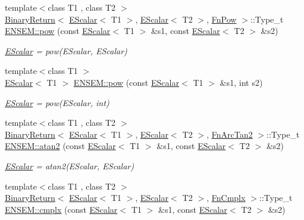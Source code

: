 \begin{DoxyCompactItemize}
\item 
{\footnotesize template$<$class T1 , class T2 $>$ }\\\mbox{\hyperlink{structENSEM_1_1BinaryReturn}{Binary\+Return}}$<$ \mbox{\hyperlink{classENSEM_1_1EScalar}{E\+Scalar}}$<$ T1 $>$, \mbox{\hyperlink{classENSEM_1_1EScalar}{E\+Scalar}}$<$ T2 $>$, \mbox{\hyperlink{structENSEM_1_1FnPow}{Fn\+Pow}} $>$\+::Type\+\_\+t \mbox{\hyperlink{group__escalar_gaa3f8d5129f1ded089d42af89bd94827d}{E\+N\+S\+E\+M\+::pow}} (const \mbox{\hyperlink{classENSEM_1_1EScalar}{E\+Scalar}}$<$ T1 $>$ \&s1, const \mbox{\hyperlink{classENSEM_1_1EScalar}{E\+Scalar}}$<$ T2 $>$ \&s2)
\begin{DoxyCompactList}\small\item\em \mbox{\hyperlink{classENSEM_1_1EScalar}{E\+Scalar}} = pow(\+E\+Scalar, E\+Scalar) \end{DoxyCompactList}\item 
{\footnotesize template$<$class T1 $>$ }\\\mbox{\hyperlink{classENSEM_1_1EScalar}{E\+Scalar}}$<$ T1 $>$ \mbox{\hyperlink{group__escalar_gaba7571beee718548316367ab8d623e70}{E\+N\+S\+E\+M\+::pow}} (const \mbox{\hyperlink{classENSEM_1_1EScalar}{E\+Scalar}}$<$ T1 $>$ \&s1, int s2)
\begin{DoxyCompactList}\small\item\em \mbox{\hyperlink{classENSEM_1_1EScalar}{E\+Scalar}} = pow(\+E\+Scalar, int) \end{DoxyCompactList}\item 
{\footnotesize template$<$class T1 , class T2 $>$ }\\\mbox{\hyperlink{structENSEM_1_1BinaryReturn}{Binary\+Return}}$<$ \mbox{\hyperlink{classENSEM_1_1EScalar}{E\+Scalar}}$<$ T1 $>$, \mbox{\hyperlink{classENSEM_1_1EScalar}{E\+Scalar}}$<$ T2 $>$, \mbox{\hyperlink{structENSEM_1_1FnArcTan2}{Fn\+Arc\+Tan2}} $>$\+::Type\+\_\+t \mbox{\hyperlink{group__escalar_ga9a9d48948d119981259ad0ebcb0acfea}{E\+N\+S\+E\+M\+::atan2}} (const \mbox{\hyperlink{classENSEM_1_1EScalar}{E\+Scalar}}$<$ T1 $>$ \&s1, const \mbox{\hyperlink{classENSEM_1_1EScalar}{E\+Scalar}}$<$ T2 $>$ \&s2)
\begin{DoxyCompactList}\small\item\em \mbox{\hyperlink{classENSEM_1_1EScalar}{E\+Scalar}} = atan2(\+E\+Scalar, E\+Scalar) \end{DoxyCompactList}\item 
{\footnotesize template$<$class T1 , class T2 $>$ }\\\mbox{\hyperlink{structENSEM_1_1BinaryReturn}{Binary\+Return}}$<$ \mbox{\hyperlink{classENSEM_1_1EScalar}{E\+Scalar}}$<$ T1 $>$, \mbox{\hyperlink{classENSEM_1_1EScalar}{E\+Scalar}}$<$ T2 $>$, \mbox{\hyperlink{structENSEM_1_1FnCmplx}{Fn\+Cmplx}} $>$\+::Type\+\_\+t \mbox{\hyperlink{group__escalar_gaccbb7d66b912e8f0972f4e50095f296e}{E\+N\+S\+E\+M\+::cmplx}} (const \mbox{\hyperlink{classENSEM_1_1EScalar}{E\+Scalar}}$<$ T1 $>$ \&s1, const \mbox{\hyperlink{classENSEM_1_1EScalar}{E\+Scalar}}$<$ T2 $>$ \&s2)

\end{DoxyCompactItemize}
